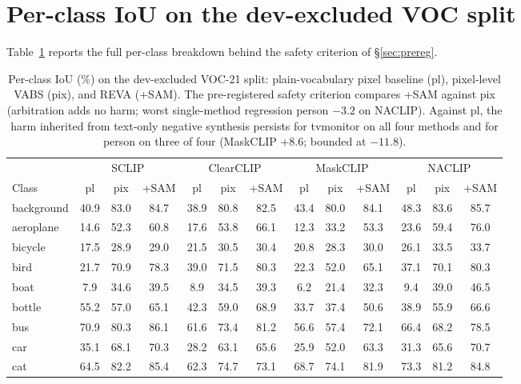 \documentclass[11pt]{article}
\newcommand{\reva}{REVA}
\begin{document}
\appendix
\section{Per-class IoU on the dev-excluded VOC split}
\label{app:perclass}

Table~\ref{tab:perclass} reports the full per-class breakdown behind the
safety criterion of \S\ref{sec:prereg}.

\begin{table}[h]
\centering\scriptsize
\caption{Per-class IoU (\%) on the dev-excluded VOC-21 split: plain-vocabulary pixel
baseline (pl), pixel-level VABS (pix), and \reva{} (+SAM). The pre-registered safety
criterion compares +SAM against pix (arbitration adds no harm; worst single-method
regression person $-3.2$ on NACLIP). Against pl, the harm inherited from text-only
negative synthesis persists for tvmonitor on all four methods and for person
on three of four (MaskCLIP $+8.6$; bounded at $-11.8$).}
\label{tab:perclass}
\begin{tabular}{lcccccccccccc}
\toprule
& \multicolumn{3}{c}{SCLIP} & \multicolumn{3}{c}{ClearCLIP} & \multicolumn{3}{c}{MaskCLIP} & \multicolumn{3}{c}{NACLIP} \\
\cmidrule(lr){2-4}\cmidrule(lr){5-7}\cmidrule(lr){8-10}\cmidrule(lr){11-13}
Class & pl & pix & +SAM & pl & pix & +SAM & pl & pix & +SAM & pl & pix & +SAM \\
\midrule
background & 40.9 & 83.0 & 84.7 & 38.9 & 80.8 & 82.5 & 43.4 & 80.0 & 84.1 & 48.3 & 83.6 & 85.7 \\
aeroplane & 14.6 & 52.3 & 60.8 & 17.6 & 53.8 & 66.1 & 12.3 & 33.2 & 53.3 & 23.6 & 59.4 & 76.0 \\
bicycle & 17.5 & 28.9 & 29.0 & 21.5 & 30.5 & 30.4 & 20.8 & 28.3 & 30.0 & 26.1 & 33.5 & 33.7 \\
bird & 21.7 & 70.9 & 78.3 & 39.0 & 71.5 & 80.3 & 22.3 & 52.0 & 65.1 & 37.1 & 70.1 & 80.3 \\
boat & 7.9 & 34.6 & 39.5 & 8.9 & 34.5 & 39.3 & 6.2 & 21.4 & 32.3 & 9.4 & 39.0 & 46.5 \\
bottle & 55.2 & 57.0 & 65.1 & 42.3 & 59.0 & 68.9 & 33.7 & 37.4 & 50.6 & 38.9 & 55.9 & 66.6 \\
bus & 70.9 & 80.3 & 86.1 & 61.6 & 73.4 & 81.2 & 56.6 & 57.4 & 72.1 & 66.4 & 68.2 & 78.5 \\
car & 35.1 & 68.1 & 70.3 & 28.2 & 63.1 & 65.6 & 25.9 & 52.0 & 63.3 & 31.3 & 65.6 & 70.7 \\
cat & 64.5 & 82.2 & 85.4 & 62.3 & 74.7 & 73.1 & 68.7 & 74.1 & 81.9 & 73.3 & 81.2 & 84.8 \\

\end{tabular}
\end{table}
\end{document}
